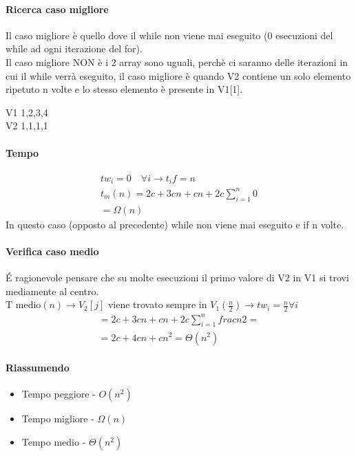 \paragraph*{Ricerca caso migliore}
Il caso migliore è quello dove il while non viene mai eseguito (0 esecuzioni del while
ad ogni iterazione del for).\\
Il caso migliore NON è i 2 array sono uguali, perchè ci saranno delle iterazioni in cui il while verrà
eseguito, il caso migliore è quando V2 contiene un solo elemento ripetuto n volte e lo stesso
elemento è presente in V1[1].
\begin{center}
    V1 1,2,3,4\\
    V2 1,1,1,1
\end{center}
\paragraph*{Tempo}
\begin{align*}
    tw_i = 0 \quad \forall i \rightarrow t_if = n\\
    t_m(n) = 2c + 3cn + cn + 2c \sum_{i=1}^n {0}\\
    =\Omega(n)
\end{align*}
In questo caso (opposto al precedente) while non viene mai eseguito e if n volte.\\
\paragraph*{Verifica caso medio}
\'E ragionevole pensare che su molte esecuzioni il primo valore di V2 in V1 si trovi
mediamente al centro.\\
T medio$(n) \rightarrow V_2[j]$ viene trovato sempre in $V_1(\frac{n}{2}) \rightarrow tw_i = \frac{n}{2}\forall i$\\
\begin{align*}
    =2c+3cn+cn+2c\sum_{i=1}^n{frac{n}{2}} = \\
    =2c+4cn+cn^2 = \Theta(n^2)
\end{align*}
\paragraph*{Riassumendo}
\begin{itemize}
    \item Tempo peggiore - $O(n^2)$
    \item Tempo migliore - $\Omega(n)$
    \item Tempo medio - $\Theta(n^2)$
\end{itemize}
